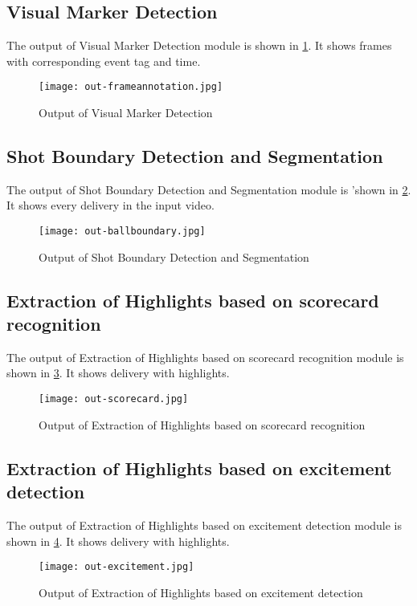 \subsection{Visual Marker Detection}
The output of Visual Marker Detection module is shown in \ref{fig:out-Visual Marker Detection}. It shows frames with corresponding event tag and time.
\begin{figure}[h]
    \centering
   \texttt{[image: out-frameannotation.jpg]}
    \caption{Output of Visual Marker Detection}
    \label{fig:out-Visual Marker Detection}
\end{figure}

\subsection{Shot Boundary Detection and Segmentation}
The output of Shot Boundary Detection and Segmentation module is 'shown in \ref{fig:out-Ballboundary}. It shows every delivery in the input video.
\begin{figure}[h]
    \centering
   \texttt{[image: out-ballboundary.jpg]}
    \caption{Output of Shot Boundary Detection and Segmentation}
    \label{fig:out-Ballboundary}
\end{figure}
\subsection{Extraction of Highlights based on scorecard recognition}
The output of Extraction of Highlights based on scorecard recognition module is shown in \ref{fig:out-scorecard}. It shows delivery with highlights.
\begin{figure}[h]
    \centering
   \texttt{[image: out-scorecard.jpg]}
    \caption{Output of Extraction of Highlights based on scorecard recognition}
    \label{fig:out-scorecard}
\end{figure}

\subsection{Extraction of Highlights based on excitement detection}
The output of Extraction of Highlights based on excitement detection module is shown in \ref{fig:out-excitement}. It shows delivery with highlights.
\begin{figure}[h]
    \centering
   \texttt{[image: out-excitement.jpg]}
    \caption{Output of Extraction of Highlights based on excitement detection}
    \label{fig:out-excitement}
\end{figure}
